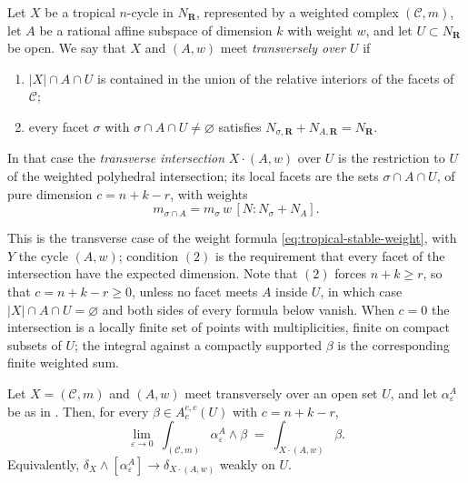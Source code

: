 \begin{definition}
\label{def:ch11-transverse-to-A}
Let $X$ be a tropical $n$-cycle in $N_{\mathbf R}$, represented by a
weighted complex $(\mathscr C,m)$, let $A$ be a rational affine subspace of
dimension $k$ with weight $w$, and let $U\subset N_{\mathbf R}$ be open.  We
say that $X$ and $(A,w)$ meet \emph{transversely over $U$} if
\begin{enumerate}
\item $|X|\cap A\cap U$ is contained in the union of the relative interiors
  of the facets of $\mathscr C$;
\item every facet $\sigma$ with $\sigma\cap A\cap U\ne\varnothing$ satisfies
  $N_{\sigma,\mathbf R}+N_{A,\mathbf R}=N_{\mathbf R}$.
\end{enumerate}
In that case the \emph{transverse intersection} $X\cdot(A,w)$ over $U$ is
the restriction to $U$ of the weighted polyhedral intersection; its local
facets are the sets $\sigma\cap A\cap U$, of pure dimension
$c=n+k-r$, with weights
\[
 m_{\sigma\cap A}=m_\sigma\,w\,[N:N_\sigma+N_A].
\]
\end{definition}

This is the transverse case of the weight formula
\eqref{eq:tropical-stable-weight}, with $Y$ the cycle $(A,w)$; condition
$(2)$ is the requirement that every facet of the intersection have the
expected dimension.  Note that $(2)$ forces $n+k\ge r$, so that
$c=n+k-r\ge0$, unless no facet meets $A$ inside $U$, in which case
$|X|\cap A\cap U=\varnothing$ and both sides of every formula below vanish.
When $c=0$ the intersection is a locally finite set of points with
multiplicities, finite on compact subsets of $U$; the integral against a
compactly supported $\beta$ is the corresponding finite weighted sum.

\begin{theorem}
\label{thm:ch11-transverse-current-product}
Let $X=(\mathscr C,m)$ and $(A,w)$ meet transversely over an open set $U$,
and let $\alpha^A_\varepsilon$ be as in
.  Then, for every
$\beta\in A^{c,c}_c(U)$ with $c=n+k-r$,
\[
 \lim_{\varepsilon\to0}\ \int_{(\mathscr C,m)}\alpha^A_\varepsilon\wedge\beta
 \;=\;\int_{X\cdot(A,w)}\beta .
\]
Equivalently,
$\delta_X\wedge[\alpha^A_\varepsilon]\to\delta_{X\cdot(A,w)}$ weakly on $U$.
\end{theorem}

